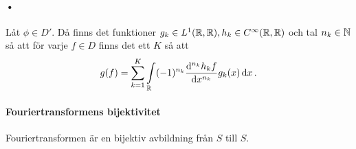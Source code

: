 \paragraph{•}
Låt $\phi\in D'$. Då finns det funktioner $g_{k}\in L^{1}(\mathbb{R}, \mathbb{R}), h_{k}\in C^{\infty}(\mathbb{R}, \mathbb{R})$ och tal $n_{k}\in\mathbb{N}$ så att för varje $f\in D$ finns det ett $K$ så att
\begin{align*}
	g(f) = \sum\limits_{k = 1}^{K}\int\limits_{\mathbb{R}}^{}(-1)^{n_{k}}\dv[n_{k}]{h_{k}f}{x} (x)g_{k}(x)\dd{x}.
\end{align*}

\proof

\paragraph{Fouriertransformens bijektivitet}
Fouriertransformen är en bijektiv avbildning från $S$ till $S$.

\proof